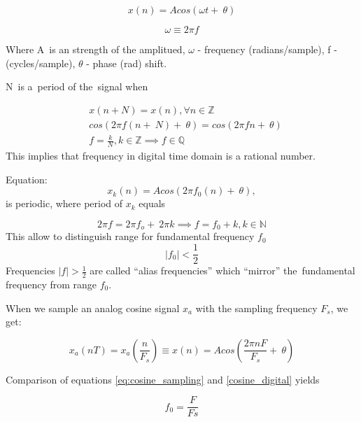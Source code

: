 \begin{equation}
	x(n) = Acos(\omega t +~\theta)
\end{equation}

\begin{equation}
	\omega \equiv 2\pi f
\end{equation}


Where A~is an strength of the amplitued, $\omega$ - frequency (radians/sample), f - (cycles/sample), $\theta$ - phase (rad) shift.  

N~is a~period of the~signal when


\begin{align}
& x(n+N) = x(n), \forall n \in \mathbb{Z} \\
& cos(2\pi f (n +~N) +~\theta) = cos(2\pi f n +~\theta) \\
& f = \frac{k}{N}, k \in \mathbb{Z} \implies f \in \mathbb{Q}
\end{align}
This implies that frequency in digital time domain is a rational number.  

Equation:
\begin{equation}
	x_k(n)=Acos(2\pi f_0(n) +~\theta),
\label{cosine_digital}
\end{equation}
is periodic, where period of $x_k$ equals


\begin{equation}
	2 \pi f = 2 \pi f_o +~2\pi k \implies f = f_0 + k, k \in \mathbb{N}
\end{equation}
This allow to distinguish range for fundamental frequency $f_0$
\begin{equation}
|f_0| < \frac{1}{2}
\label{fundamental_one_half}
\end{equation}
Frequencies $|f| > \frac{1}{2}$ are called ``alias frequencies'' which ``mirror'' the~fundamental frequency from range $f_0$.


When we sample an analog cosine signal $x_a$ with the sampling frequency $F_s$, we get:

\begin{equation}
x_a(nT)=x_a(\frac{n}{F_s}) \equiv x(n) = Acos(\frac{2\pi n F}{F_s} +~\theta) 
\label{eq:cosine_sampling}
\end{equation}

Comparison of equations \eqref{eq:cosine_sampling} and \eqref{cosine_digital} yields 

\begin{equation}
f_0 = \frac{F}{Fs}
\label{fundamental_sampling}
\end{equation}

